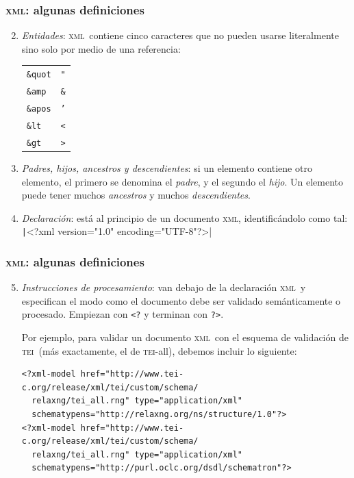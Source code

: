 \documentclass[%
  handout, %
  xcolor=svgnames]{beamer}
\newcommand*{\rojoit}[1]{\textit{\textcolor[HTML]{8B0000}{#1}}}
\newcommand*{\TEI}{\textsc{tei}}
\newcommand*{\XML}{\textsc{xml}}
\begin{document}
\begin{frame}[fragile]
  \frametitle{\XML: algunas definiciones}
  \begin{enumerate}
    \setcounter{enumi}{1}
    \item \rojoit{Entidades}: \XML\ contiene cinco caracteres que no pueden usarse literalmente sino solo por medio de una referencia:

      \begin{center}
        \begin{tabular}{ll}
          \texttt{\&quot} & \texttt{"} \\
          \texttt{\&amp}  & \texttt{\&} \\
          \texttt{\&apos} & \texttt{'} \\
          \texttt{\&lt}   & \texttt{<} \\
          \texttt{\&gt}   & \texttt{>} \\
        \end{tabular}
      \end{center}
      
    \item \rojoit{Padres, hijos, ancestros y descendientes}: si un elemento contiene otro elemento, el primero se denomina el \textit{padre}, y el segundo el \textit{hijo}. Un elemento puede tener muchos \textit{ancestros} y muchos \textit{descendientes}.
      
    \item \rojoit{Declaración}: está al principio de un documento \XML, identificándolo como tal: \texttt|<?xml version="1.0" encoding="UTF-8"?>|
  \end{enumerate}
\end{frame}



\begin{frame}[fragile]
  \frametitle{\XML: algunas definiciones}
  \begin{enumerate}
    \setcounter{enumi}{4}
    \item \rojoit{Instrucciones de procesamiento}: van debajo de la declaración \XML\ y especifican el modo como el documento debe ser validado semánticamente o procesado. Empiezan con \verb|<?| y terminan con \verb|?>|.

      \bigskip

      Por ejemplo, para validar un documento \XML\ con el esquema de validación de \TEI\ (más exactamente, el de \TEI-all), debemos incluir lo siguiente:

\begin{verbatim}
<?xml-model href="http://www.tei-c.org/release/xml/tei/custom/schema/
  relaxng/tei_all.rng" type="application/xml"
  schematypens="http://relaxng.org/ns/structure/1.0"?>
<?xml-model href="http://www.tei-c.org/release/xml/tei/custom/schema/
  relaxng/tei_all.rng" type="application/xml"
  schematypens="http://purl.oclc.org/dsdl/schematron"?>
\end{verbatim}
  \end{enumerate}
\end{frame}
\end{document}
